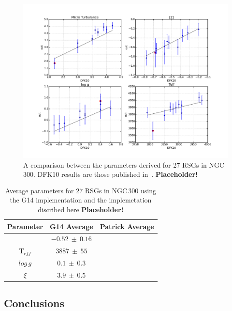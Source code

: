 \documentclass[12pt]{article}
\begin{document}
\begin{figure}
 \centering
 \includegraphics[width=\textwidth]{compare-DFK10}
 \caption[NGC\,300 G14]{
A comparison between the parameters derived for 27 RSGs in NGC\,300.
DFK10 results are those published in~\cite{...}.
\textbf{Placeholder!}\label{fig:n300G14}
         }
\end{figure}

\begin{table}
\caption[Parameter comparisons G14]{Average parameters for 27 RSGs in NGC\,300 using the G14 implementation and the implemetation discribed here
\textbf{Placeholder!}\label{tb:G14}}
\scriptsize
\begin{center}
\begin{tabular}{ccc}
 \hline
 \hline
Parameter & G14 Average & Patrick Average \\
 \hline
[Z]       & $-0.52~\pm~0.16$ &  \\
T$_{eff}$ & $3887~\pm~55$ &  \\
$log\,g$  & $0.1~\pm~0.3$ &  \\
$\xi$     & $3.9~\pm~0.5$ &  \\
 \hline
\end{tabular}
\end{center}
\end{table}

\subsection{Conclusions} %
\label{sub:conclusions}

{}

\end{document}
